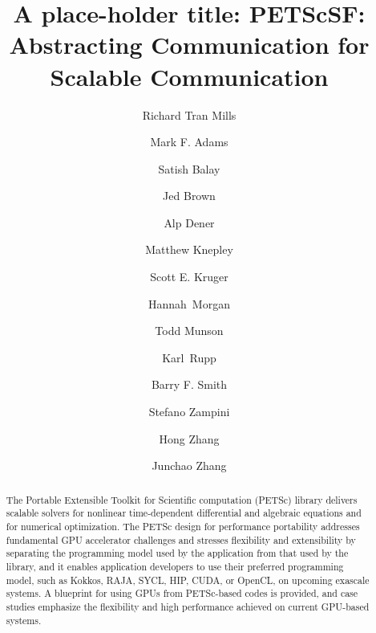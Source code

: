 \documentclass[5p,times]{elsarticle}
\newif\ifargonnereport
\begin{document}
\ifargonnereport

\fi

\begin{frontmatter}

\title{A place-holder title:  PETScSF: Abstracting Communication for Scalable Communication}

\author[argonne-address]{Richard Tran Mills } %

\author[lbnl-address]{Mark F. Adams}
\author[argonne-address]{Satish Balay}
\author[cu-address]{Jed Brown}
\author[argonne-address]{Alp Dener}
\author[buffalo-address]{Matthew Knepley}
\author[techx-address]{Scott E. Kruger}
\author[uchicago-address]{Hannah~Morgan}
\author[argonne-address]{Todd Munson}
\author[argonne-address,tuwien-address]{Karl~Rupp}
\author[argonne-associate-address]{Barry F. Smith}
\author[kaust-address]{Stefano Zampini}
\author[argonne-address]{Hong Zhang}
\author[argonne-address]{Junchao Zhang}

\address[argonne-address]{Argonne National Laboratory, 9700 S. Cass Avenue, Lemont, IL 60439 US}
\address[buffalo-address]{University at Buffalo, Buffalo, NY 14260 USA}
\address[lbnl-address]{Lawrence Berkeley National Laboratory, Berkeley, CA 94720 USA}
\address[uchicago-address]{University of Chicago, Chicago, IL 60637 USA}
\address[cu-address]{University of Colorado Boulder, Boulder, CO 80302 USA}
\address[techx-address]{5260 Arapahoe Ave. Suite, A, Boulder, CO 80303 USA}
\address[tuwien-address]{Institute for Microelectronics, TU Wien, Gusshausstrasse 27-29/E360, A-1040 Wien}
\address[argonne-associate-address]{Argonne Associate of Global Empire, LLC, Argonne National Laboratory, 9700 S. Cass Avenue, Lemont, IL 60439 USA }
\address[kaust-address]{King Abdullah University of Science and Technology, Extreme Computing Research Center, Thuwal, Saudi Arabia}

\begin{abstract}
The Portable Extensible Toolkit for Scientific computation (PETSc)
library delivers scalable solvers for
nonlinear time-dependent differential and algebraic equations and for numerical optimization.
The PETSc design for performance portability addresses fundamental GPU accelerator challenges and stresses
flexibility and extensibility by separating the
programming model
used by the application from that used by the library,
and it enables application
developers to use their preferred programming model, such as
Kokkos, RAJA, SYCL, HIP, CUDA, or OpenCL,
on upcoming exascale systems.
A blueprint for using GPUs from PETSc-based codes is provided, and 
case studies emphasize the 
flexibility and high performance achieved 
on current GPU-based systems.
\end{abstract}


\end{frontmatter}
\end{document}
